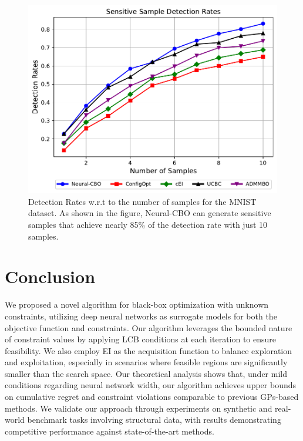 \begin{figure}[H]
    \centering
\includegraphics[width=\textwidth]{Figures/Neural-CBO/sensitive_sample_detection_rate.pdf}
    \caption{Detection Rates w.r.t to the number of samples for the MNIST dataset. As shown in the figure, Neural-CBO can generate sensitive samples that achieve nearly 85\% of the detection rate with just 10 samples.}
    \label{fig:neural-cbo_sensitive_sample}
\end{figure}



\section{Conclusion}
We proposed a novel algorithm for black-box optimization with unknown constraints, utilizing deep neural networks as surrogate models for both the objective function and constraints. Our algorithm leverages the bounded nature of constraint values by applying LCB conditions at each iteration to ensure feasibility. We also employ EI as the acquisition function to balance exploration and exploitation, especially in scenarios where feasible regions are significantly smaller than the search space. Our theoretical analysis shows that, under mild conditions regarding neural network width, our algorithm achieves upper bounds on cumulative regret and constraint violations comparable to previous GPs-based methods. We validate our approach through experiments on synthetic and real-world benchmark tasks involving structural data, with results demonstrating competitive performance against state-of-the-art methods.

